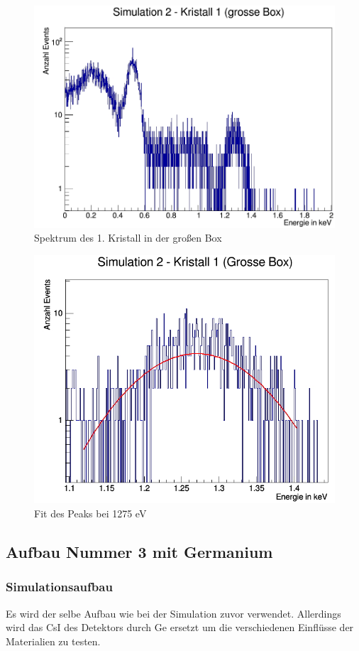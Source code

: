 \documentclass[a4paper,14pt,twoside]{article}
\begin{document}
			
			\begin{figure}[H]
				\begin{center}
				\includegraphics[width=0.7\linewidth]{Simulation2(1KGB)_ganz}
				\caption{Spektrum des 1. Kristall in der großen Box}
				\label{S2_1KGB_ganz}
				\end{center}
			\end{figure}
			
			\begin{figure}[H]
				\begin{center}
				\includegraphics[width=0.7\linewidth]{Simulation2(1KGB)_1275_fit}
				\caption{Fit des Peaks bei 1275 eV}
				\label{S2_1KGB_1275_fit}
				\end{center}
			\end{figure}
			 
	\subsection{Aufbau Nummer 3 mit Germanium}
		\subsubsection{Simulationsaufbau}
			Es wird der selbe Aufbau wie bei der Simulation zuvor verwendet. Allerdings wird das CsI des Detektors durch Ge ersetzt um die verschiedenen Einflüsse der Materialien zu testen.
			
\end{document}
